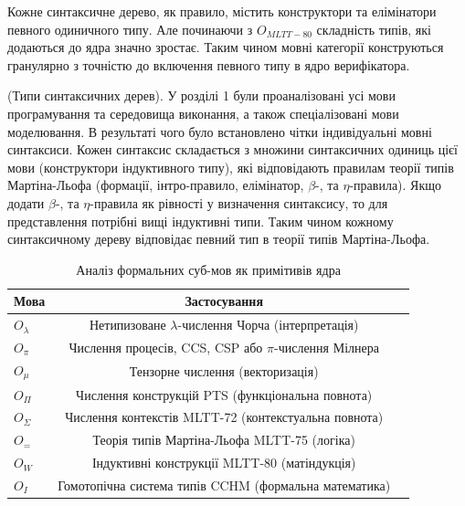 Кожне синтаксичне дерево, як правило, містить конструктори
та елімінатори певного одиничного типу. Але починаючи з $O_{MLTT-80}$
складність типів, які додаються до ядра значно зростає.
Таким чином мовні категорії конструються гранулярно з
точністю до включення певного типу в ядро верифікатора.

\begin{definition} (Типи синтаксичних дерев).
У розділі 1 були проаналізовані усі мови програмування та середовища виконання,
а також спеціалізовані мови моделювання. В результаті чого було встановлено
чітки індивідуальні мовні синтаксиси. Кожен синтаксис складається з
множини синтаксичних одиниць цієї мови (конструктори індуктивного типу),
які відповідають правилам теорії типів Мартіна-Льофа (формації, інтро-правило,
елімінатор, $\beta$-, та $\eta$-правила). Якщо додати $\beta$-, та $\eta$-правила
як рівності у визначення синтаксису, то для представлення потрібні вищі індуктивні типи.
Таким чином кожному синтаксичному дереву відповідає певний тип в теорії типів Мартіна-Льофа.
\begin{table}
  \caption{Аналіз формальних суб-мов як примітивів ядра}
 \begin{tabular}{lcc}
    \hline
\rowcolor{ZimaBlue}
       \textbf{Мова} & \textbf{Застосування} \\
    \hline
    \rowcolor{LightGray}
       $O_\lambda$                     & Нетипизоване $\lambda$-числення Чорча (інтерпретація) \\
    \rowcolor{LightGray}
       $O_\pi$                         & Числення процесів, CCS, CSP або $\pi$-числення Мілнера\\
    \rowcolor{LightGray}
       $O_\mu$                         & Тензорне числення (векторизація) \\
    \hline
    \rowcolor{LightGray}
       $O_\Pi$                         & Числення конструкцій PTS (функціональна повнота) \\
    \rowcolor{LightGray}
       $O_\Sigma$                      & Числення контекстів MLTT-72 (контекстуальна повнота) \\
    \rowcolor{LightGray}
       $O_=$                           & Теорія типів Мартіна-Льофа MLTT-75 (логіка) \\
    \rowcolor{LightGray}
       $O_W$                           & Індуктивні конструкції MLTT-80 (матіндукція) \\
    \rowcolor{LightGray}
       $O_{I}$                         & Гомотопічна система типів CCHM (формальна математика) \\

\end{tabular}
\end{table}
\end{definition}

